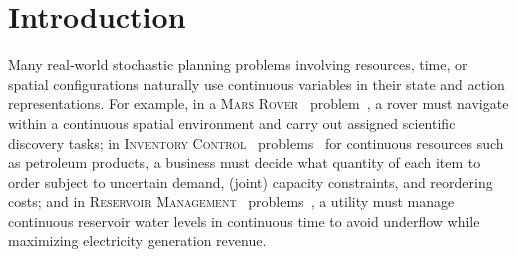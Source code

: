 \documentclass[twoside,11pt]{article}
\newcommand{\MarsRover}{\textsc{Mars Rover }}
\newcommand{\InventoryControl}{\textsc{Inventory Control }}
\newcommand{\WaterReservoir}{\textsc{Reservoir Management }}
\begin{document}





\section{Introduction}
\label{Introduction}

Many real-world stochastic planning problems involving resources,
time, or spatial configurations naturally use continuous variables in
their state and action representations.  For example, in a
\MarsRover\ problem~\cite{bresina02}, a rover must navigate within a
continuous spatial environment and carry out assigned scientific
discovery tasks; in \InventoryControl\ problems~\cite{Scarf_Karlin58}
for continuous resources such as petroleum products, a business must
decide what quantity of each item to order subject to uncertain
demand, (joint) capacity constraints, and reordering costs; and in
\WaterReservoir\ problems~\cite{reservoir}, a utility must manage
continuous reservoir water levels in continuous time to avoid
underflow while maximizing electricity generation revenue.
\end{document}
